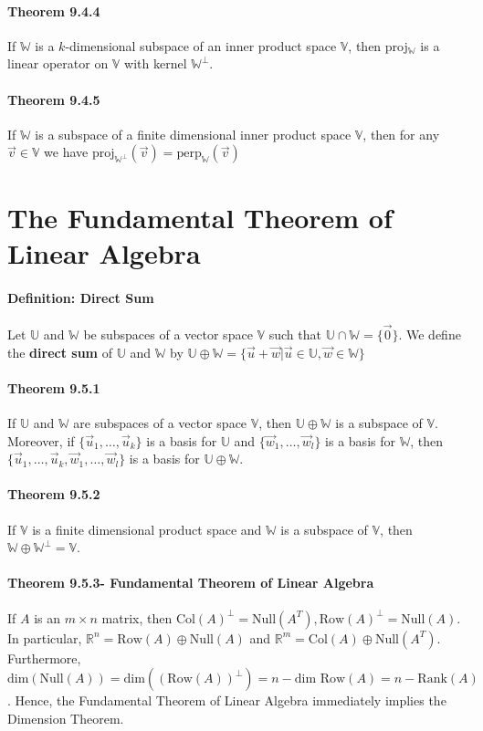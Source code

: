 \documentclass[10pt,letter]{article}
\begin{document}
\paragraph{Theorem 9.4.4}
If $\mathbb{W}$ is a $k$-dimensional subspace of an inner product space $\mathbb{V}$, then proj$_\mathbb{W}$ is a linear operator on $\mathbb{V}$ with kernel $\mathbb{W}^\perp$. 

\paragraph{Theorem 9.4.5}
If $\mathbb{W}$ is a subspace of a finite dimensional inner product space $\mathbb{V}$, then for any $\vec{v}\in\mathbb{V}$ we have $\text{proj}_{\mathbb{W}^\perp}(\vec{v})=\text{perp}_\mathbb{W}(\vec{v})$

\section*{The Fundamental Theorem of Linear Algebra}
\paragraph{Definition: Direct Sum}
Let $\mathbb{U}$ and $\mathbb{W}$ be subspaces of a vector space $\mathbb{V}$ such that $\mathbb{U}\cap\mathbb{W}=\{\vec{0}\}$. We define the \textbf{direct sum} of $\mathbb{U}$ and $\mathbb{W}$ by $\mathbb{U}\oplus\mathbb{W}=\{\vec{u}+\vec{w}|\vec{u}\in\mathbb{U},\vec{w}\in\mathbb{W}\}$

\paragraph{Theorem 9.5.1}
If $\mathbb{U}$ and $\mathbb{W}$ are subspaces of a vector space $\mathbb{V}$, then $\mathbb{U}\oplus\mathbb{W}$ is a subspace of $\mathbb{V}$. Moreover, if $\{\vec{u}_1,\ldots,\vec{u}_k\}$ is a basis for $\mathbb{U}$ and $\{\vec{w}_1,\ldots,\vec{w}_l\}$ is a basis for $\mathbb{W}$, then $\{\vec{u}_1,\ldots,\vec{u}_k,\vec{w}_1,\ldots,\vec{w}_l\}$ is a basis for $\mathbb{U}\oplus\mathbb{W}$. 

\paragraph{Theorem 9.5.2}
If $\mathbb{V}$ is a finite dimensional product space and $\mathbb{W}$ is a subspace of $\mathbb{V}$, then $\mathbb{W}\oplus\mathbb{W}^\perp=\mathbb{V}$.

\paragraph{Theorem 9.5.3- Fundamental Theorem of Linear Algebra}
If $A$ is an $m\times n$ matrix, then $\text{Col}(A)^\perp=\text{Null}(A^T),\text{Row}(A)^\perp=\text{Null}(A)$. In particular, $\mathbb{R}^n=\text{Row}(A)\oplus\text{Null}(A)$ and $\mathbb{R}^m=\text{Col}(A)\oplus\text{Null}(A^T)$. Furthermore, $\text{dim}(\text{Null}(A))=\text{dim}((\text{Row}(A))^\perp)=n-\text{dim Row}(A)=n-\text{Rank}(A)$. Hence, the Fundamental Theorem of Linear Algebra immediately implies the Dimension Theorem.
\end{document}
